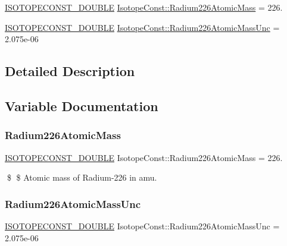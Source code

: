 \begin{DoxyCompactItemize}
\item 
\mbox{\hyperlink{group___isotope_const-_macros_ga8f45a7272ce02c0b4c65c44636ed719a}{I\+S\+O\+T\+O\+P\+E\+C\+O\+N\+S\+T\+\_\+\+D\+O\+U\+B\+LE}} \mbox{\hyperlink{group___isotope_const-_radium-_ra226_ga8a98cb7d136d10c032a8666a2ccee9bf}{Isotope\+Const\+::\+Radium226\+Atomic\+Mass}} = 226.
\item 
\mbox{\hyperlink{group___isotope_const-_macros_ga8f45a7272ce02c0b4c65c44636ed719a}{I\+S\+O\+T\+O\+P\+E\+C\+O\+N\+S\+T\+\_\+\+D\+O\+U\+B\+LE}} \mbox{\hyperlink{group___isotope_const-_radium-_ra226_gacbaab42cccb4c510abd3e216347ad355}{Isotope\+Const\+::\+Radium226\+Atomic\+Mass\+Unc}} = 2.\+075e-\/06
\end{DoxyCompactItemize}


\subsection{Detailed Description}


\subsection{Variable Documentation}
\mbox{\label{group___isotope_const-_radium-_ra226_ga8a98cb7d136d10c032a8666a2ccee9bf}} 
\subsubsection{\texorpdfstring{Radium226\+Atomic\+Mass}{Radium226AtomicMass}}
{\footnotesize\ttfamily \mbox{\hyperlink{group___isotope_const-_macros_ga8f45a7272ce02c0b4c65c44636ed719a}{I\+S\+O\+T\+O\+P\+E\+C\+O\+N\+S\+T\+\_\+\+D\+O\+U\+B\+LE}} Isotope\+Const\+::\+Radium226\+Atomic\+Mass = 226.}

\$ \$ Atomic mass of Radium-\/226 in amu. \mbox{\label{group___isotope_const-_radium-_ra226_gacbaab42cccb4c510abd3e216347ad355}} 
\subsubsection{\texorpdfstring{Radium226\+Atomic\+Mass\+Unc}{Radium226AtomicMassUnc}}
{\footnotesize\ttfamily \mbox{\hyperlink{group___isotope_const-_macros_ga8f45a7272ce02c0b4c65c44636ed719a}{I\+S\+O\+T\+O\+P\+E\+C\+O\+N\+S\+T\+\_\+\+D\+O\+U\+B\+LE}} Isotope\+Const\+::\+Radium226\+Atomic\+Mass\+Unc = 2.\+075e-\/06}

